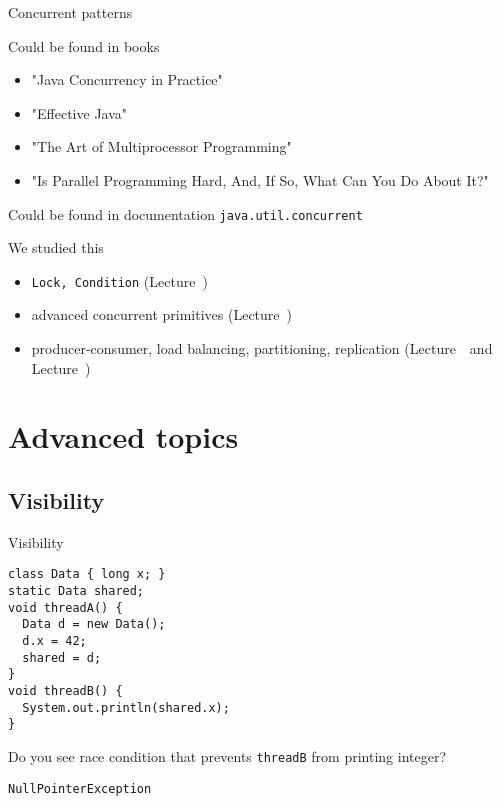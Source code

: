 \begin{frame}{Concurrent patterns}

Could be found in books
\begin{itemize}
  \item "Java Concurrency in Practice"
  \item "Effective Java"
  \item "The Art of Multiprocessor Programming"
  \item "Is Parallel Programming Hard, And, If So, What Can You Do About It?"
\end{itemize}

Could be found in documentation \texttt{java.util.concurrent}

We studied this
\begin{itemize}
  \item \texttt{Lock, Condition} (Lecture~\basicNum)
  \item advanced concurrent primitives (Lecture~\syncPrimitivesNum)
  \item producer-consumer, load balancing, partitioning, replication (Lecture~\syncPrimitivesNum \ and Lecture~\patternsNum)
\end{itemize}

\end{frame}


\section{Advanced topics}

\subsection{Visibility}
\showTOCSub

\begin{frame}[t,fragile]{Visibility}

\begin{verbatim}
class Data { long x; }
static Data shared;
void threadA() {
  Data d = new Data();
  d.x = 42;
  shared = d;
}
void threadB() {
  System.out.println(shared.x);
}
\end{verbatim}

\pause

Do you see race condition that prevents \texttt{threadB} from printing integer?

\pause

\texttt{NullPointerException}

\end{frame}



